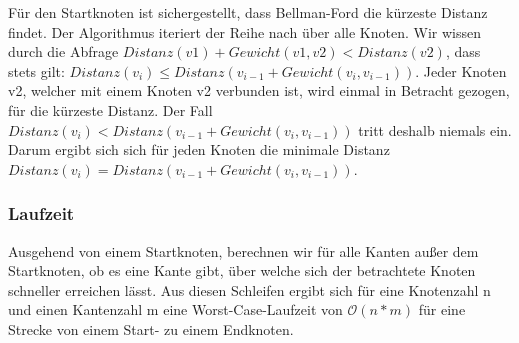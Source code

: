\documentclass[12pt]{scrartcl}%
\theoremstyle{nonumberplain}
\newcommand{\bO}[1]{\mathcal O(#1)}
\begin{document}
Für den Startknoten ist sichergestellt, dass Bellman-Ford die kürzeste Distanz findet. Der Algorithmus iteriert der Reihe nach über alle Knoten. Wir wissen durch die Abfrage $Distanz(v1) + Gewicht(v1,v2) < Distanz(v2)$, dass stets gilt: $Distanz(v_i) \le Distanz(v_{i-1} + Gewicht(v_i, v_{i-1}))$. Jeder Knoten v2, welcher mit einem Knoten v2 verbunden ist, wird einmal in Betracht gezogen, für die kürzeste Distanz. Der Fall $Distanz(v_i) < Distanz(v_{i-1} + Gewicht(v_i, v_{i-1}))$ tritt deshalb niemals ein. Darum ergibt sich sich für jeden Knoten die minimale Distanz $Distanz(v_i) = Distanz(v_{i-1} + Gewicht(v_i, v_{i-1}))$.

\subsubsection*{Laufzeit}
Ausgehend von einem Startknoten, berechnen wir für alle Kanten außer dem Startknoten, ob es eine Kante gibt, über welche sich der betrachtete Knoten schneller erreichen lässt. Aus diesen Schleifen ergibt sich für eine Knotenzahl n und einen Kantenzahl m eine Worst-Case-Laufzeit von $\bO{n*m}$ für eine Strecke von einem Start- zu einem Endknoten.
\end{document}
